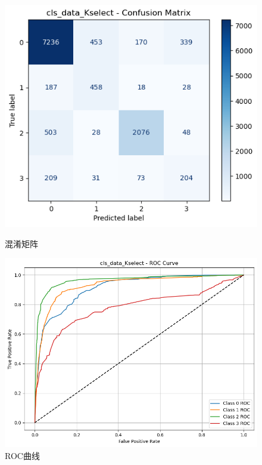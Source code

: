 \documentclass[10pt]{article}
\begin{document}
\begin{figure}[H]
\centering
\begin{minipage}[t]{0.45\textwidth}
  \centering
  \includegraphics[width=\linewidth]{cls_lda_10s.png}
  \caption{混淆矩阵}
  \label{fig:49}
\end{minipage}
\hfill
\begin{minipage}[t]{0.52\textwidth}
  \centering
  \includegraphics[width=\linewidth]{cls_lda_10s2.png}
  \caption{ROC曲线}
  \label{fig:50}
\end{minipage}
\end{figure}
\end{document}
